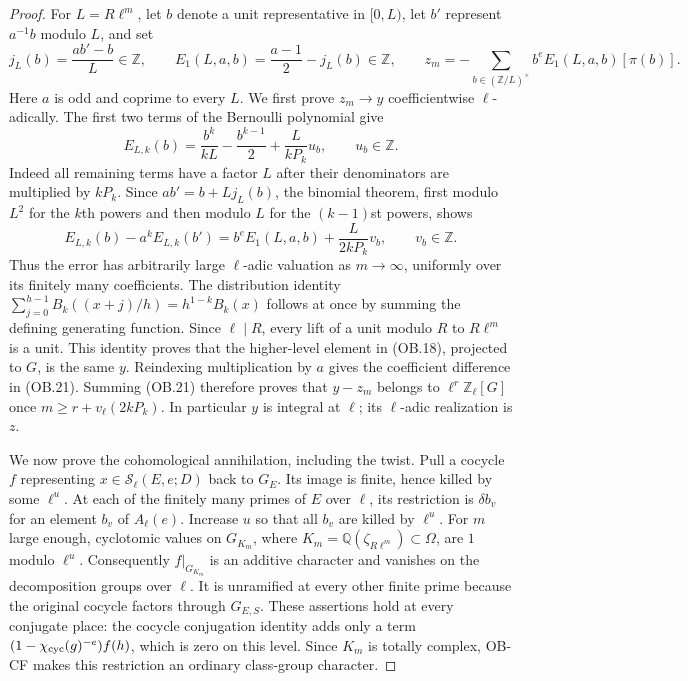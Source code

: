 \begin{proof}
For $L=R\ell^m$, let $b$ denote a unit representative in $[0,L)$,
let $b'$ represent $a^{-1}b$ modulo $L$, and set
\[
 j_L(b)=\frac{ab'-b}{L}\in\mathbb Z,\qquad
 E_1(L,a,b)=\frac{a-1}{2}-j_L(b)\in\mathbb Z,
 \qquad
 z_m=-\sum_{b\in(\mathbb Z/L)^\times}
                  b^e E_1(L,a,b)[\pi(b)].             \tag{OB.20}
\]
Here $a$ is odd and coprime to every $L$.
We first prove $z_m\to y$ coefficientwise $\ell$-adically.
The first two terms of the Bernoulli polynomial give
\[
 E_{L,k}(b)=\frac{b^k}{kL}-\frac{b^{k-1}}2
                      +\frac{L}{kP_k}u_b,
                  \qquad u_b\in\mathbb Z.
\]
Indeed all remaining terms have a factor $L$ after their
denominators are multiplied by $kP_k$.
Since $ab'=b+Lj_L(b)$, the binomial theorem, first modulo $L^2$
for the $k$th powers and then modulo $L$ for the $(k-1)$st powers,
shows
\[
 E_{L,k}(b)-a^kE_{L,k}(b')
      =b^eE_1(L,a,b)+\frac{L}{2kP_k}v_b,
                         \qquad v_b\in\mathbb Z.
 \tag{OB.21}
\]
Thus the error has arbitrarily large $\ell$-adic valuation as
$m\to\infty$, uniformly over its finitely many coefficients.
The distribution identity
$\sum_{j=0}^{h-1}B_k((x+j)/h)=h^{1-k}B_k(x)$
follows at once by summing the defining generating function.
Since $\ell\mid R$, every lift of a unit modulo $R$ to $R\ell^m$
is a unit.  This identity proves that the higher-level element in
(OB.18), projected to $G$, is the same $y$.  Reindexing multiplication
by $a$ gives the coefficient difference in (OB.21).  Summing
(OB.21) therefore proves that $y-z_m$ belongs to
$\ell^r\mathbb Z_\ell[G]$ once
$m\ge r+v_\ell(2kP_k)$.  In particular $y$ is integral at $\ell$;
its $\ell$-adic realization is $z$.

We now prove the cohomological annihilation, including the twist.
Pull a cocycle $f$ representing $x\in\mathcal S_\ell(E,e;D)$
back to $G_E$.  Its image is finite, hence killed by some
$\ell^u$.  At each of the finitely many primes of $E$ over
$\ell$, its restriction is $\delta b_v$ for an element $b_v$
of $A_\ell(e)$.  Increase $u$ so that all $b_v$ are killed by
$\ell^u$.  For $m$ large enough, cyclotomic values on
$G_{K_m}$, where $K_m=\mathbb Q(\zeta_{R\ell^m})\subset\Omega$,
are $1$ modulo $\ell^u$.  Consequently
$f|_{G_{K_m}}$ is an additive character and vanishes on the
decomposition groups over $\ell$.  It is unramified at every
other finite prime because the original cocycle factors through
$G_{E,S}$.  These assertions hold at every conjugate place:
the cocycle conjugation identity adds only a term
$(1-\chi_{\rm cyc}(g)^{-e})f(h)$, which is zero on this level.
Since $K_m$ is totally complex, OB-CF makes this restriction an
ordinary class-group character.


\end{proof}
